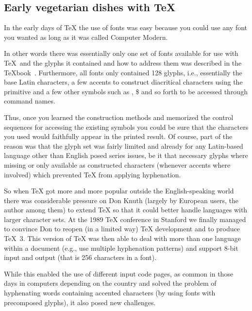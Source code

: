 \documentclass{ltugboat}
\begin{document}
\subsection{Early  vegetarian dishes with \TeX{}}

In the early days of \TeX{} the use of fonts was easy because you
could use any font you wanted as long as it was called Computer
Modern.

In other words there was essentially only one set of fonts available
for use with \TeX\ and the glyphs it contained and how to address them
was described in the \TeX{}book~\cite{Knuth:ct-a}. Furthermore, all fonts only
contained 128 glyphs, i.e., essentially the base Latin characters, a
few accents to construct diacritical characters using the 
primitive and a few other symbols such as \textdagger, \$ and so forth
to be accessed through command names.

Thus, once you learned the construction methods and memorized the
control sequences for accessing the existing symbols you could be sure
that the characters you used would faithfully appear in the printed
result. Of course, part of the reason was that the glyph set was
fairly limited and already for any Latin-based language other than
English posed series issues, be it that necessary glyphs where missing
or only available as constructed characters (whenever accents where
involved) which prevented \TeX{} from applying hyphenation.

So when \TeX{} got more and more popular outside the English-speaking
world there was considerable pressure on Don Knuth (largely by
European users, the author among them) to extend \TeX{} so that it
could better handle languages with larger character sets. At the 1989
\TeX{} conference in Stanford we finally managed to convince Don to
reopen (in a limited way) \TeX{} development and to produce
\TeX~3. This version of \TeX{} was then able to deal with more than
one language within a document (e.g., use multiple hyphenation
patterns) and support 8-bit input and output (that is 256 characters
in a font).

While this enabled the use of different input code pages, as common in
those days in computers depending on the country and solved the
problem of hyphenating words containing accented characters (by using
fonts with precomposed glyphs), it also posed new challenges.
\end{document}
